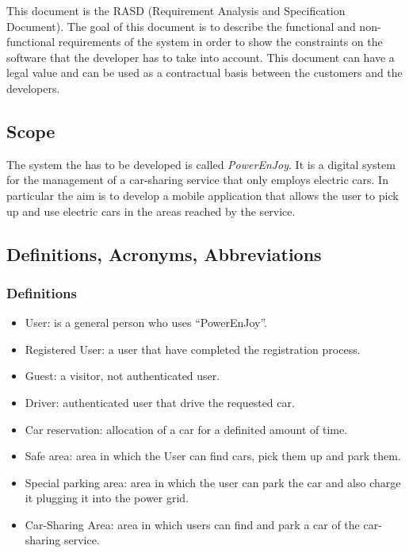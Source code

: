 \documentclass[english]{article}
\newcounter{requirement}
\begin{document}
This document is the RASD (Requirement Analysis and Specification Document). The goal of this document is to describe the functional and non-functional requirements of the system in order to show the constraints on the software that the developer has to take into account. This document can have a legal value and can be used as a contractual basis between the customers and the developers.

\subsection{Scope}
The system the has to be developed is called \emph{PowerEnJoy}. It is a digital system for the management of a car-sharing service that only employs electric cars. In particular the aim is to develop a mobile application that allows the user to pick up and use electric cars in the areas reached by the service. 

\subsection{Definitions, Acronyms, Abbreviations}


\subsubsection{Definitions}
\begin{itemize}
	\item User: is a general person who uses ``PowerEnJoy''.
	\item Registered User: a user that have completed the registration process.
	\item Guest: a visitor, not authenticated user.
	\item Driver: authenticated user that drive the requested car.
	\item Car reservation: allocation of a car for a definited amount of time.


	\item Safe area: area in which the User can find cars, pick them up and park them.
	\item Special parking area: area in which the user can park the car and also charge it plugging it into the power grid. 
	\item Car-Sharing Area: area in which users can find and park a car of the car-sharing service.
	
\end{itemize}
\end{document}

